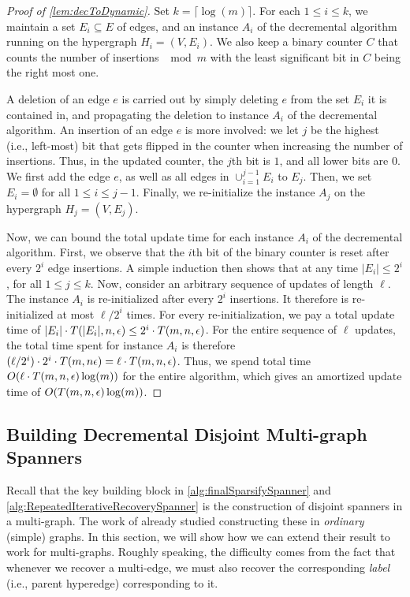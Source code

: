 \documentclass{article}
\begin{document}
\begin{proof}[Proof of \cref{lem:decToDynamic}]
    Set $k = \lceil \log(m) \rceil$. For each $1 \leq i \leq k$, we maintain a set $E_i \subseteq E$ of edges, and an instance $A_i$ of the decremental algorithm running on the hypergraph $H_i = (V, E_i)$. We also keep a binary counter $C$ that counts the number of insertions $\mod m$ with the least significant bit in $C$ being the right most one. 

    A deletion of an edge $e$ is carried out by simply deleting $e$ from the set $E_i$ it is contained in, and propagating the deletion to instance $A_i$ of the decremental algorithm. An insertion of an edge $e$ is more involved: we let $j$ be the highest (i.e., left-most) bit that gets flipped in the counter when increasing the number of insertions. Thus, in the updated counter, the $j$th bit is $1$, and all lower bits are $0$. We first add the edge $e$, as well as all edges in $\cup_{i = 1}^{j-1} E_i$ to $E_j$. Then, we set $E_i = \emptyset$ for all $1 \leq i \leq j-1$. Finally, we re-initialize the instance $A_j$ on the hypergraph $H_j = (V, E_j)$.

    Now, we can bound the total update time for each instance $A_i$ of the decremental algorithm. First, we observe that the $i$th bit of the binary counter is reset after every $2^i$ edge insertions. A simple induction then shows that at any time $|E_i| \leq 2^i$, for all $1 \leq j \leq k$. Now, consider an arbitrary sequence of updates of length $\ell$. The instance $A_i$ is re-initialized after every $2^i$ insertions. It therefore is re-initialized at most $\ell / 2^i$ times. For every re-initialization, we pay a total update time of $|E_i| \cdot T(|E_i|, n, \epsilon) \leq 2^i \cdot T(m, n, \epsilon)$. For the entire sequence of $\ell$ updates, the total time spent for instance $A_i$ is therefore $(\ell/2^i) \cdot 2^i \cdot T(m, n \epsilon) = \ell \cdot T(m ,n , \epsilon)$. Thus, we spend total time $O(\ell \cdot T(m ,n , \epsilon) \log(m))$ for the entire algorithm, which gives an amortized update time of $O(T(m, n, \epsilon)\log(m))$.
\end{proof}

\subsection{Building Decremental Disjoint Multi-graph Spanners}

Recall that the key building block in \cref{alg:finalSparsifySpanner} and \cref{alg:RepeatedIterativeRecoverySpanner} is the construction of disjoint spanners in a multi-graph. The work of \cite{ADKKP16} already studied constructing these in \emph{ordinary} (simple) graphs. In this section, we will show how we can extend their result to work for multi-graphs. Roughly speaking, the difficulty comes from the fact that whenever we recover a multi-edge, we must also recover the corresponding \emph{label} (i.e., parent hyperedge) corresponding to it. 
\end{document}
